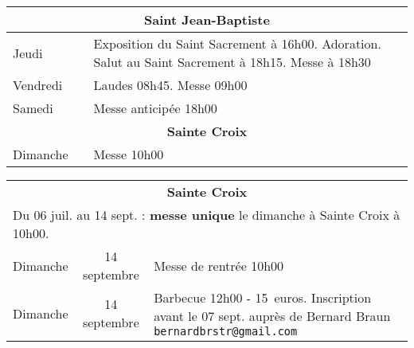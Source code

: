 \documentclass[french,11pt]{article}
\begin{document}
\begin{tabular} {lcp{9cm}}
\multicolumn{3}{c}{\textbf{Saint Jean-Baptiste} } \\ \hline
Jeudi    & &
Exposition du Saint Sacrement à 16h00. Adoration. Salut au Saint Sacrement à 18h15. Messe à 18h30 
 \\ \hline
Vendredi & & Laudes 08h45. Messe 09h00 \\ \hline
Samedi   & & Messe anticipée 18h00 \\ \hline
\multicolumn{3}{c}{\textbf{Sainte Croix} } \\ \hline
Dimanche  & & Messe 10h00\\ \hline
\end{tabular}

\begin{framed}
\begin{tabular} {lcp{7cm}}
\multicolumn{3}{c}{\textbf{Sainte Croix} } \\
\multicolumn{3}{l}{ Du 06 juil. au 14 sept. : \textbf{messe unique} le dimanche à Sainte Croix à 10h00.} \\
Dimanche & 14 septembre & Messe de rentrée 10h00 \\
Dimanche & 14 septembre &  Barbecue 12h00 - 15~euros. \newline Inscription avant le 07 sept. auprès de Bernard Braun \texttt{bernardbrstr@gmail.com} \\
\end{tabular}
\end{framed}
\end{document}
